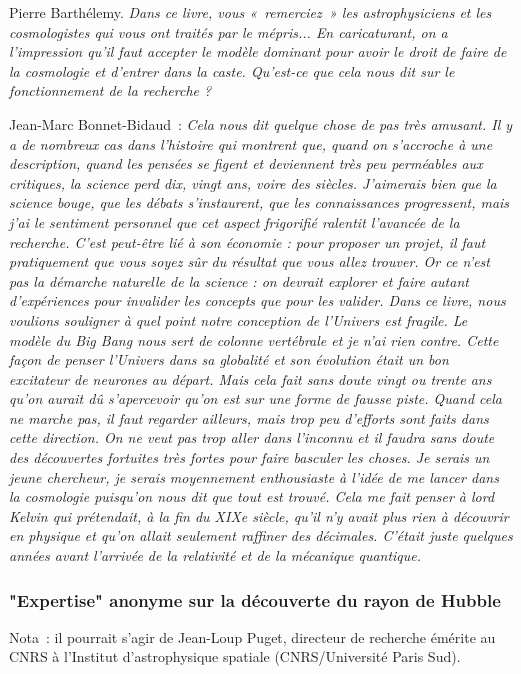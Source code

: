 \documentclass[a4paper,12pt]{article}
\begin{document}
Pierre Barthélemy. \textit{Dans ce livre, vous « remerciez » les astrophysiciens et les cosmologistes qui vous ont traités par le mépris... En caricaturant, on a l'impression qu'il faut accepter le modèle dominant pour avoir le droit de faire de la cosmologie et d'entrer dans la caste. Qu'est-ce que cela nous dit sur le fonctionnement de la recherche ?}

Jean-Marc Bonnet-Bidaud : \textit{Cela nous dit quelque chose de pas très amusant. Il y a de nombreux cas dans l'histoire qui montrent que, quand on s'accroche à une description, quand les pensées se figent et deviennent très peu perméables aux critiques, la science perd dix, vingt ans, voire des siècles. J'aimerais bien que la science bouge, que les débats s'instaurent, que les connaissances progressent, mais j'ai le sentiment personnel que cet aspect frigorifié ralentit l'avancée de la recherche. C'est peut-être lié à son économie : pour proposer un projet, il faut pratiquement que vous soyez sûr du résultat que vous allez trouver. Or ce n'est pas la démarche naturelle de la science : on devrait explorer et faire autant d'expériences pour invalider les concepts que pour les valider. Dans ce livre, nous voulions souligner à quel point notre conception de l'Univers est fragile. Le modèle du Big Bang nous sert de colonne vertébrale et je n’ai rien contre. Cette façon de penser l'Univers dans sa globalité et son évolution était un bon excitateur de neurones au départ. Mais cela fait sans doute vingt ou trente ans qu'on aurait dû s'apercevoir qu'on est sur une forme de fausse piste. Quand cela ne marche pas, il faut regarder ailleurs, mais trop peu d'efforts sont faits dans cette direction. On ne veut pas trop aller dans l'inconnu et il faudra sans doute des découvertes fortuites très fortes pour faire basculer les choses. Je serais un jeune chercheur, je serais moyennement enthousiaste à l'idée de me lancer dans la cosmologie puisqu'on nous dit que tout est trouvé. Cela me fait penser à lord Kelvin qui prétendait, à la fin du XIXe siècle, qu'il n'y avait plus rien à découvrir en physique et qu'on allait seulement raffiner des décimales. C'était juste quelques années avant l'arrivée de la relativité et de la mécanique quantique.}

\subsubsection{"Expertise" anonyme sur la découverte du rayon de Hubble} 

Nota : il pourrait s'agir de Jean-Loup Puget, directeur de recherche émérite au CNRS à l'Institut d'astrophysique spatiale (CNRS/Université Paris Sud). %
\end{document}
